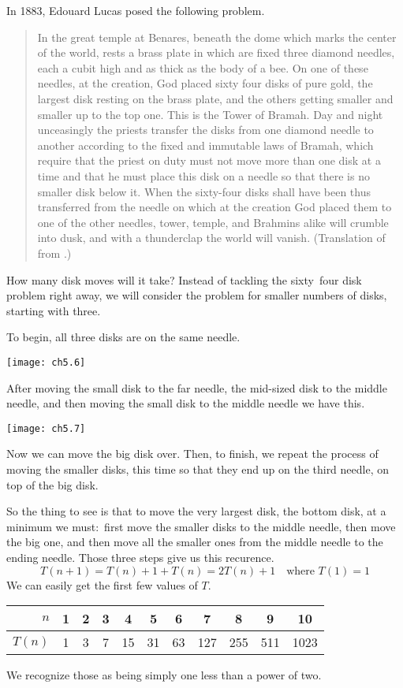 In 1883, Edouard Lucas posed the following problem.
\begin{quotation}
  In the great temple at Benares, beneath the dome which marks the center 
  of the world, rests a brass plate in which are fixed three diamond needles,
  each a cubit high and as thick as the body of a bee.
  On one of these needles, at the creation,
  God placed sixty four disks of pure gold, the largest disk resting on 
  the brass plate, and the others getting smaller and smaller up to the
  top one.
  This is the Tower of Bramah.
  Day and night unceasingly the priests transfer the disks from one diamond
  needle to another according to the fixed and immutable laws of Bramah,
  which require that the priest on duty must not move more than one disk at a 
  time and that he must place this disk on a needle so that there is no
  smaller disk below it.
  When the sixty-four disks shall have been thus transferred from the needle
  on which at the creation God placed them to one of the other needles,
  tower, temple, and Brahmins alike will crumble into dusk, and with
  a thunderclap the world will vanish.
  (Translation of \cite{DeParville} from \cite{Ball}.)
\end{quotation}
How many disk moves will it take?
Instead of tackling the sixty~four disk problem right away, 
we will consider the 
problem for smaller numbers of disks, starting with three.

To begin, all three disks are on the same needle.
\begin{center}
  \texttt{[image: ch5.6]}
\end{center}
After moving the small disk to the far needle, the mid-sized disk to the
middle needle, and then moving the small disk to the middle needle
we have this. 
\begin{center}
  \texttt{[image: ch5.7]}
\end{center}
Now we can  move the big disk over.
Then, to finish, we repeat the process of moving the smaller 
disks, this time so that they end up on the third needle, 
on top of the big disk.

So the thing to see is that to move the very largest disk, the bottom disk,
at a minimum we must:~first move the smaller disks to the middle needle, 
then move the big one,
and then move all the smaller ones from the middle needle 
to the ending needle. 
Those three steps give us this recurence.
\begin{equation*}
  T(n+1)=T(n)+1+T(n)=2T(n)+1 \quad \text{where $T(1)=1$}
\end{equation*} 
We can easily get the first few values of $T$.
\begin{center}
  \begin{tabular}{r|cccccccccc}
    $n$    &1  &2  &3  &4  &5  &6     &7    &8    &9   &10  \\
    \hline
    $T(n)$ &1  &3  &7  &15  &31  &63  &127  &255  &511 &1023 
  \end{tabular}
\end{center}
We recognize those as being simply one less than a power of two.

